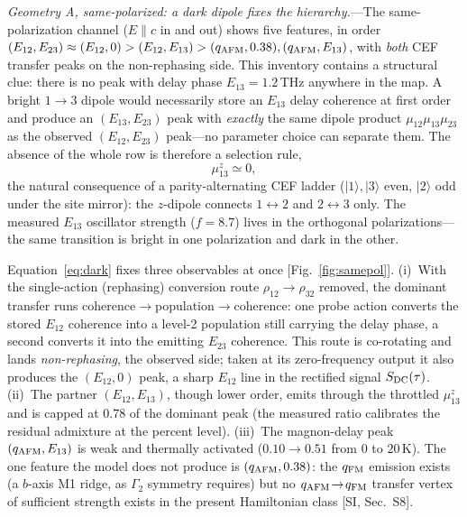 \documentclass[aps,prl,twocolumn,superscriptaddress,longbibliography]{revtex4-2}
\newcommand{\ket}[1]{|#1\rangle}
\newcommand{\qafm}{q_{\rm AFM}}
\newcommand{\qfm}{q_{\rm FM}}
\begin{document}
\emph{Geometry A, same-polarized: a dark dipole fixes the
hierarchy.}---The same-polarization channel ($E\!\parallel\!c$ in and
out) shows five features, in order
$(E_{12},E_{23})\approx(E_{12},0)>(E_{12},E_{13})>(\qafm,0.38),
(\qafm,E_{13})$, with \emph{both} CEF transfer peaks on the
non-rephasing side.  This inventory contains a structural clue: there is
no peak with delay phase $E_{13}=1.2$\,THz anywhere in the map.  A
bright $1\!\to\!3$ dipole would necessarily store an $E_{13}$ delay
coherence at first order and produce an $(E_{13},E_{23})$ peak with
\emph{exactly} the same dipole product $\mu_{12}\mu_{13}\mu_{23}$ as the
observed $(E_{12},E_{23})$ peak---no parameter choice can separate them.
The absence of the whole row is therefore a selection rule,
\begin{equation}
  \mu^{z}_{13}\simeq0,
  \label{eq:dark}
\end{equation}
the natural consequence of a parity-alternating CEF ladder
($\ket1,\ket3$ even, $\ket2$ odd under the site mirror): the
$z$-dipole connects $1\!\leftrightarrow\!2$ and $2\!\leftrightarrow\!3$
only.  The measured $E_{13}$ oscillator strength ($f=8.7$) lives in the
orthogonal polarizations---the same transition is bright in one
polarization and dark in the other.

Equation~\eqref{eq:dark} fixes three observables at once
[Fig.~\ref{fig:samepol}].  (i)~With the single-action (rephasing)
conversion route $\rho_{12}\!\to\!\rho_{32}$ removed, the dominant
transfer runs coherence$\to$population$\to$coherence: one probe action
converts the stored $E_{12}$ coherence into a level-2 population still
carrying the delay phase, a second converts it into the emitting
$E_{23}$ coherence.  This route is co-rotating and lands
\emph{non-rephasing}, the observed side; taken at its zero-frequency
output it also produces the $(E_{12},0)$ peak, a sharp $E_{12}$ line in
the rectified signal $S_{\rm DC}(\tau)$.  (ii)~The partner
$(E_{12},E_{13})$, though lower order, emits through the throttled
$\mu^z_{13}$ and is capped at $0.78$ of the dominant peak (the measured
ratio calibrates the residual admixture at the percent level).
(iii)~The magnon-delay peak $(\qafm,E_{13})$ is weak and thermally
activated ($0.10\to0.51$ from $0$ to $20$\,K).  The one feature the
model does not produce is $(\qafm,0.38)$: the $\qfm$ emission exists (a
$b$-axis M1 ridge, as $\Gamma_2$ symmetry requires) but no
$\qafm\!\to\!\qfm$ transfer vertex of sufficient strength exists in the
present Hamiltonian class [SI, Sec.~S8].
\end{document}
